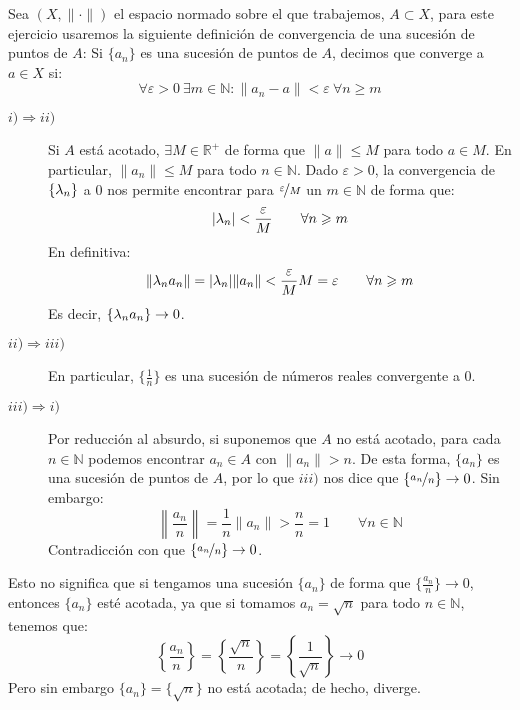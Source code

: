 \begin{ejercicio}
    \noindent
    Sea $(X,\|\cdot\|)$ el espacio normado sobre el que trabajemos, $A\subset X$, para este ejercicio usaremos la siguiente definición de convergencia de una sucesión de puntos de $A$: Si $\{a_n\}$ es una sucesión de puntos de $A$, decimos que converge a $a\in X$ si:
    \begin{equation*}
        \forall \varepsilon >0~\exists m\in \mathbb{N} : \|a_n - a\| < \varepsilon~\forall n\geq m
    \end{equation*}
    \begin{description}
        \item [$i)\Longrightarrow ii)$] Si $A$ está acotado, $\exists M\in \mathbb{R}^+$ de forma que $\|a\| \leq M$ para todo $a\in M$. En particular, $\|a_n\| \leq M$ para todo $n\in \mathbb{N}$. Dado $\varepsilon>0$, la convergencia de $\{\lambda_n\}$ a 0 nos permite encontrar para $\nicefrac{\varepsilon}{M}$ un $m\in \mathbb{N}$ de forma que:
            \begin{equation*}
                |\lambda_n| < \dfrac{\varepsilon}{M} \qquad \forall n\geqslant m
            \end{equation*}
            En definitiva:
            \begin{equation*}
                \|\lambda_n a_n\| = |\lambda_n| \|a_n\| < \dfrac{\varepsilon}{M} M = \varepsilon \qquad \forall n\geqslant m
            \end{equation*}
            Es decir, $\{\lambda_n a_n\}\rightarrow 0$.
        \item [$ii)\Longrightarrow iii)$] En particular, $\{\frac{1}{n}\}$ es una sucesión de números reales convergente a 0.
        \item [$iii)\Longrightarrow i)$] Por reducción al absurdo, si suponemos que $A$ no está acotado, para cada $n\in \mathbb{N}$ podemos encontrar $a_n \in A$ con $\|a_n\| > n$. De esta forma, $\{a_n\}$ es una sucesión de puntos de $A$, por lo que $iii)$ nos dice que $\{\nicefrac{a_n}{n}\}\rightarrow 0$. Sin embargo:
            \begin{equation*}
                \left\|\dfrac{a_n}{n}\right\| = \dfrac{1}{n} \|a_n\| > \dfrac{n}{n} = 1 \qquad \forall n\in \mathbb{N}
            \end{equation*}
            Contradicción con que $\{\nicefrac{a_n}{n}\}\rightarrow 0$.
    \end{description}
    Esto no significa que si tengamos una sucesión $\{a_n\}$ de forma que $\{\frac{a_n}{n}\}\rightarrow 0$, entonces $\{a_n\}$ esté acotada, ya que si tomamos $a_n = \sqrt{n}$ para todo $n\in \mathbb{N}$, tenemos que:
    \begin{equation*}
        \left\{\dfrac{a_n}{n}\right\} = \left\{\dfrac{\sqrt{n}}{n}\right\} = \left\{\dfrac{1}{\sqrt{n}}\right\} \rightarrow 0
    \end{equation*}
    Pero sin embargo $\{a_n\} = \{\sqrt{n}\}$ no está acotada; de hecho, diverge.
\end{ejercicio}

